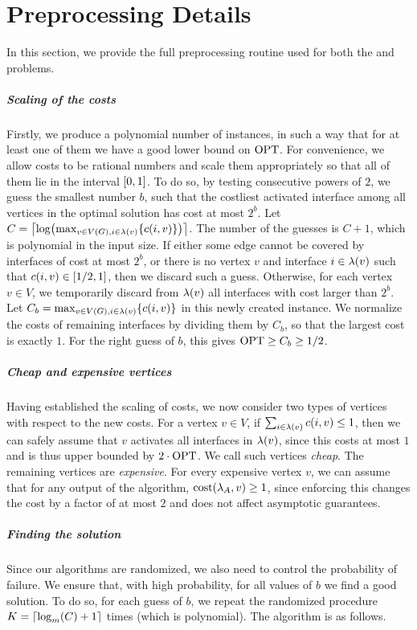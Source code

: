 \section{Preprocessing Details} \label{sec:appendix-preprocessing}

In this section, we provide the full preprocessing routine used for both the \coverage and \connectivity problems.

\subparagraph*{Scaling of the costs}
Firstly, we produce a polynomial number of instances, in such a way that for at least one of them we have a good lower bound on $\textnormal{OPT}$. For convenience, we allow costs to be rational numbers and scale them appropriately so that all of them lie in the interval $\mathopen{}\left[ 0,1 \right]$. To do so, by testing consecutive powers of $2$, we guess the smallest number $b$, such that the costliest activated interface among all vertices in the optimal solution has cost at most $2^b$. Let $C=\mathopen{}\left\lceil \log\mathopen{}\left( \max_{v\in V\mathopen{}\left( G \right), i\in \lambda\mathopen{}\left( v \right)} \mathopen{}\left\{ c(i,v) \right\} \right) \right\rceil$. The number of the guesses is $C+1$, which is polynomial in the input size. If either some edge cannot be covered by interfaces of cost at most $2^b$, or there is no vertex $v$ and interface $i\in \lambda\mathopen{}\left( v \right)$ such that $c\mathopen{}\left( i,v \right)\in\mathopen{}\left[ 1/2,1 \right]$, then we discard such a guess. Otherwise, for each vertex $v\in V$, we temporarily discard from $\lambda\mathopen{}\left( v \right)$ all interfaces with cost larger than $2^b$. Let $C_b=\max_{v\in V\mathopen{}\left( G \right), i\in \lambda\mathopen{}\left( v \right)} \mathopen{}\left\{ c(i,v) \right\}$ in this newly created instance. We normalize the costs of remaining interfaces by dividing them by $C_b$, so that the largest cost is exactly $1$. For the right guess of $b$, this gives $\textnormal{OPT}\geq C_b\geq 1/2$.

\subparagraph*{Cheap and expensive vertices}
Having established the scaling of costs, we now consider two types of vertices with respect to the new costs. For a vertex $v\in V$, if $\sum_{i\in \lambda\mathopen{}\left( v \right)} c\mathopen{}\left( i,v \right)\leq 1$, then we can safely assume that $v$ activates all interfaces in $\lambda\mathopen{}\left( v \right)$, since this costs at most $1$ and is thus upper bounded by $2\cdot\textnormal{OPT}$. We call such vertices \emph{cheap}. The remaining vertices are \emph{expensive}. For every expensive vertex $v$, we can assume that for any output of the algorithm, $\textnormal{cost}\mathopen{}\left( \lambda_A,v \right)\geq 1$, since enforcing this changes the cost by a factor of at most $2$ and does not affect asymptotic guarantees.

\subparagraph*{Finding the solution}
Since our algorithms are randomized, we also need to control the probability of failure. We ensure that, with high probability, for all values of $b$ we find a good solution. To do so, for each guess of $b$, we repeat the randomized procedure $K=\mathopen{}\left\lceil \log_m\mathopen{}\left( C \right)+1 \right\rceil$ times (which is polynomial). The algorithm is as follows.

